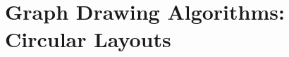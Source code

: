 %
%
%

\section{Graph Drawing Algorithms: Circular Layouts}

{}

\label{section-last-graphdrawing-library-in-manual}





